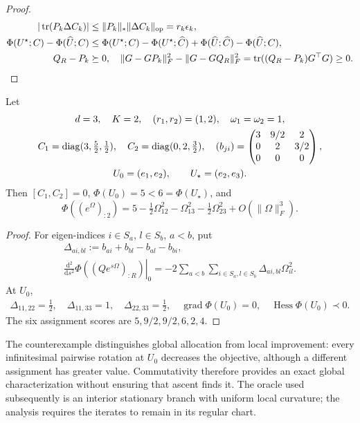 \begin{proof}
\begin{align}
 |\operatorname{tr}(P_k\Delta C_k)|&\le\|P_k\|_*\|\Delta C_k\|_{\mathrm{op}}=r_k\epsilon_k,\\
 \Phi(U^\star;C)-\Phi(\widehat U;C)
 &\le\Phi(U^\star;C)-\Phi(U^\star;\widehat C)
       +\Phi(\widehat U;\widehat C)-\Phi(\widehat U;C),\\
 Q_R-P_k&\succeq0,\quad
 \|G-GP_k\|_F^2-\|G-GQ_R\|_F^2
 =\operatorname{tr}((Q_R-P_k)G^\top G)\ge0.
\end{align}
\end{proof}
\begin{proposition}\label{prop:tf-cycle}
Let
\begin{gather}
 d=3,\quad K=2,\quad(r_1,r_2)=(1,2),\quad\omega_1=\omega_2=1,\\
 C_1=\operatorname{diag}(3,\tfrac52,\tfrac12),\quad
 C_2=\operatorname{diag}(0,2,\tfrac32),\quad
 (b_{ji})=\begin{pmatrix}3&9/2&2\\0&2&3/2\\0&0&0\end{pmatrix},\\
 U_0=(e_1,e_2),\qquad U_\star=(e_2,e_3).
\end{gather}
Then $[C_1,C_2]=0$, $\Phi(U_0)=5<6=\Phi(U_\star)$, and
\begin{equation}
 \Phi((e^{\Omega})_{:2})=5-\tfrac12\Omega_{12}^2
                              -\Omega_{13}^2-\tfrac12\Omega_{23}^2
                              +O(\|\Omega\|_F^3).
\end{equation}
\end{proposition}
\begin{proof}
For eigen-indices $i\in S_a$, $l\in S_b$, $a<b$, put
\begin{gather}
 \Delta_{ai,bl}:=b_{ai}+b_{bl}-b_{al}-b_{bi},\\
 \left.\frac{\mathrm d^2}{\mathrm ds^2}\Phi((Qe^{s\Omega})_{:R})\right|_{0}
 =-2\sum_{a<b}\sum_{i\in S_a,l\in S_b}\Delta_{ai,bl}\Omega_{il}^2.
\end{gather}
At $U_0$,
\begin{gather}
 \Delta_{11,22}=\tfrac12,\quad \Delta_{11,33}=1,\quad
 \Delta_{22,33}=\tfrac12,\quad
 \operatorname{grad}\Phi(U_0)=0,\quad\operatorname{Hess}\Phi(U_0)\prec0.
\end{gather}
The six assignment scores are $5,9/2,9/2,6,2,4$.
\end{proof}
The counterexample distinguishes global allocation from local improvement:
every infinitesimal pairwise rotation at $U_0$ decreases the objective, although
a different assignment has greater value. Commutativity therefore provides an
exact global characterization without ensuring that ascent finds it. The
oracle used subsequently is an interior stationary branch with uniform local
curvature; the analysis requires the iterates to remain in its regular chart.

